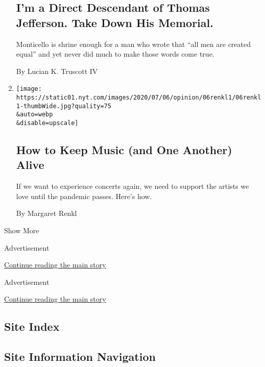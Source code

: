 \begin{enumerate}
  \hypertarget{im-a-direct-descendant-of-thomas-jefferson-take-down-his-memorial}{%
  \subsection{I'm a Direct Descendant of Thomas Jefferson. Take Down His
  Memorial.}\label{im-a-direct-descendant-of-thomas-jefferson-take-down-his-memorial}}

  Monticello is shrine enough for a man who wrote that ``all men are
  created equal'' and yet never did much to make those words come true.

  By Lucian K. Truscott IV
\item
  \href{/2020/07/05/opinion/coronavirus-chase-rice-country-music.html}{}

  \texttt{[image: https://static01.nyt.com/images/2020/07/06/opinion/06renkl1/06renkl1-thumbWide.jpg?quality=75\\\&auto=webp\\\&disable=upscale]}

  \hypertarget{how-to-keep-music-and-one-another-alive}{%
  \subsection{How to Keep Music (and One Another)
  Alive}\label{how-to-keep-music-and-one-another-alive}}

  If we want to experience concerts again, we need to support the
  artists we love until the pandemic passes. Here's how.

  By Margaret Renkl
\end{enumerate}

Show More

Advertisement

\protect\hyperlink{after-mid1}{Continue reading the main story}

Advertisement

\protect\hyperlink{after-mktg}{Continue reading the main story}

\hypertarget{site-index}{%
\subsection{Site Index}\label{site-index}}

\hypertarget{site-information-navigation}{%
\subsection{Site Information
Navigation}\label{site-information-navigation}}

